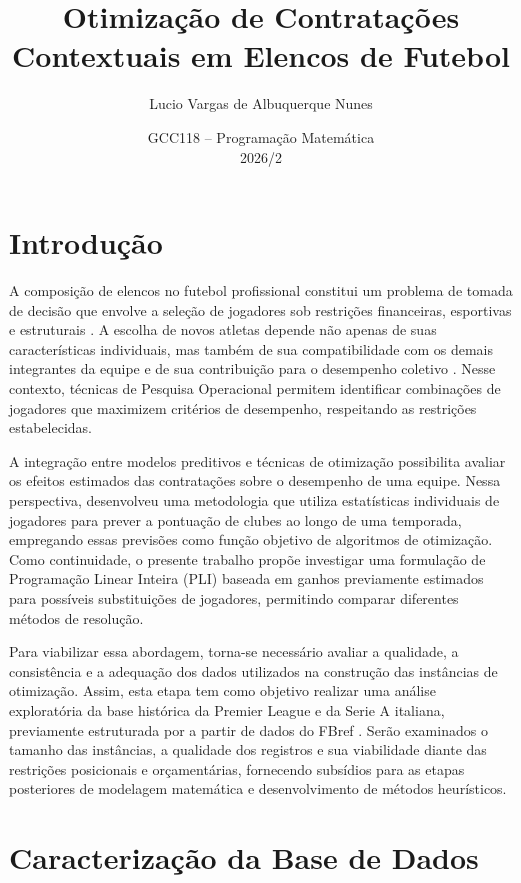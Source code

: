 \documentclass[12pt,a4paper]{article}
\title{\textbf{Otimização de Contratações Contextuais em Elencos de Futebol}}
\author{Lucio Vargas de Albuquerque Nunes}
\date{GCC118 -- Programação Matemática \\ 2026/2}
\begin{document}
\maketitle

\section*{Introdução}

A composição de elencos no futebol profissional constitui um problema de tomada de decisão que envolve a seleção de jogadores sob restrições financeiras, esportivas e estruturais \parencite{pantuso2017,dantas2025}. A escolha de novos atletas depende não apenas de suas características individuais, mas também de sua compatibilidade com os demais integrantes da equipe e de sua contribuição para o desempenho coletivo \parencite{jarvandi2013}. Nesse contexto, técnicas de Pesquisa Operacional permitem identificar combinações de jogadores que maximizem critérios de desempenho, respeitando as restrições estabelecidas.

A integração entre modelos preditivos e técnicas de otimização possibilita avaliar os efeitos estimados das contratações sobre o desempenho de uma equipe. Nessa perspectiva, \textcite{nunes2026} desenvolveu uma metodologia que utiliza estatísticas individuais de jogadores para prever a pontuação de clubes ao longo de uma temporada, empregando essas previsões como função objetivo de algoritmos de otimização. Como continuidade, o presente trabalho propõe investigar uma formulação de Programação Linear Inteira (PLI) baseada em ganhos previamente estimados para possíveis substituições de jogadores, permitindo comparar diferentes métodos de resolução.

Para viabilizar essa abordagem, torna-se necessário avaliar a qualidade, a consistência e a adequação dos dados utilizados na construção das instâncias de otimização. Assim, esta etapa tem como objetivo realizar uma análise exploratória da base histórica da Premier League e da Serie A italiana, previamente estruturada por \textcite{nunes2026} a partir de dados do FBref \parencite{fbref}. Serão examinados o tamanho das instâncias, a qualidade dos registros e sua viabilidade diante das restrições posicionais e orçamentárias, fornecendo subsídios para as etapas posteriores de modelagem matemática e desenvolvimento de métodos heurísticos.

\section*{Caracterização da Base de Dados}
\end{document}

